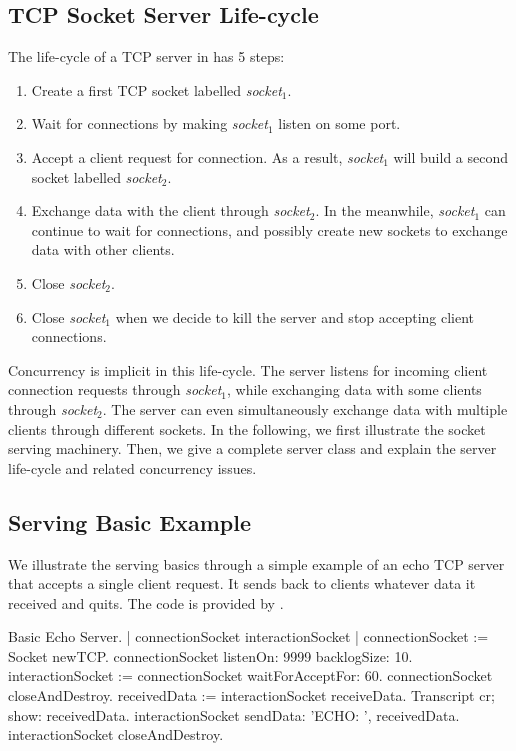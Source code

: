 \documentclass[a4paper,10pt,twoside]{book}
\begin{document}
\subsection{TCP Socket Server Life-cycle}
The life-cycle of a TCP server in \pharo  has 5 steps:
\begin{enumerate}
\item Create a first TCP socket labelled \textit{socket$_1$}.
\item Wait for connections by making \textit{socket$_1$}  listen on some port.
\item Accept a client request for connection. As a result, \textit{socket$_1$} will build a second socket labelled \textit{socket$_2$}.
\item Exchange data with the client through \textit{socket$_2$}. In the meanwhile, \textit{socket$_1$} can continue to wait for connections, and possibly create new sockets to exchange data with other clients. 
\item Close \textit{socket$_2$}.
\item Close \textit{socket$_1$} when we decide to kill the server and stop accepting client connections.
\end{enumerate}

Concurrency is implicit in this life-cycle.
The server listens for incoming client connection requests through \textit{socket$_1$}, while exchanging data with some clients through \textit{socket$_2$}.
The server can even simultaneously exchange data with multiple clients through different sockets.
In the following, we first illustrate the socket serving machinery.
Then, we give a complete server class and explain the server life-cycle and related concurrency issues.

\subsection{Serving Basic Example}
We illustrate the serving basics through a simple example of an echo TCP server that accepts a single client request.
It sends back to clients whatever data it received and quits.
The code is provided by .

\begin{script}[servingBasicExample]{Basic Echo Server.}
| connectionSocket interactionSocket |
connectionSocket := Socket newTCP.
connectionSocket listenOn: 9999 backlogSize: 10.
interactionSocket := connectionSocket waitForAcceptFor: 60.
connectionSocket closeAndDestroy.
receivedData := interactionSocket receiveData.
Transcript cr; show: receivedData.
interactionSocket sendData: 'ECHO: ', receivedData.
interactionSocket closeAndDestroy.
\end{script}
\end{document}
